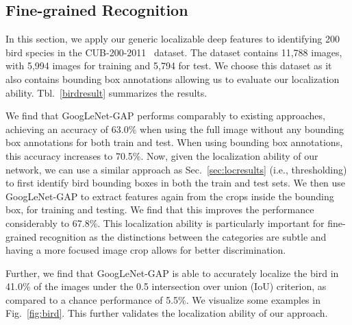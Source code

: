 \documentclass[10pt,twocolumn,letterpaper]{article}
\begin{document}
\subsection{Fine-grained Recognition}
\label{sec:finegrained}

In this section, we apply our generic localizable deep features to identifying 200 bird species in the CUB-200-2011~\cite{WelinderEtal2010} dataset. The dataset contains 11,788 images, with 5,994 images for training and 5,794 for test. We choose this dataset as it also contains bounding box annotations allowing us to evaluate our localization ability. Tbl.~\ref{birdresult} summarizes the results.

We find that GoogLeNet-GAP performs comparably to existing approaches, achieving an accuracy of 63.0\% when using the full image without any bounding box annotations for both train and test. When using bounding box annotations, this accuracy increases to 70.5\%. Now, given the localization ability of our network, we can use a similar approach as Sec.~\ref{sec:locresults} (i.e., thresholding) to first identify bird bounding boxes in both the train and test sets. We then use GoogLeNet-GAP to extract features again from the crops inside the bounding box, for training and testing. We find that this improves the performance considerably to 67.8\%. This localization ability is particularly important for fine-grained recognition as the distinctions between the categories are subtle and having a more focused image crop allows for better discrimination.

Further, we find that GoogLeNet-GAP is able to accurately localize the bird in 41.0\% of the images under the 0.5 intersection over union (IoU) criterion, as compared to a chance performance of 5.5\%. We visualize some examples in Fig.~\ref{fig:bird}. This further validates the localization ability of our approach.
\end{document}
